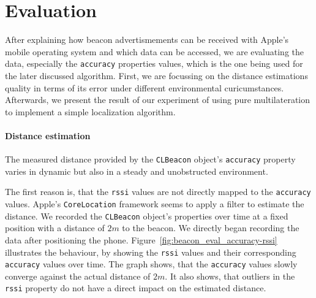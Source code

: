 
\section{Evaluation}
After explaining how beacon advertismements can be received with Apple's mobile operating system and which data can be accessed, we are evaluating the data, especially the \texttt{accuracy} properties values, which is the one being used for the later discussed algorithm.
First, we are focussing on the distance estimations quality in terms of its error under different environmental curicumstances.
Afterwards, we present the result of our experiment of using pure multilateration to implement a simple localization algorithm.

\paragraph{Distance estimation}

The measured distance provided by the \texttt{CLBeacon} object's \texttt{accuracy} property varies in dynamic but also in a steady and unobstructed environment.

The first reason is, that the \texttt{rssi} values are not directly mapped to the \texttt{accuracy} values.
Apple's \texttt{CoreLocation} framework seems to apply a filter to estimate the distance.
We recorded the \texttt{CLBeacon} object's properties over time at a fixed position with a distance of $2m$ to the beacon.
We directly began recording the data after positioning the phone.
Figure~\ref{fig:beacon_eval_accuracy-rssi} illustrates the behaviour, by showing the \texttt{rssi} values and their corresponding \texttt{accuracy} values over time.
The graph shows, that the \texttt{accuracy} values slowly converge against the actual distance of $2m$. It also shows, that outliers in the \texttt{rssi} property do not have a direct impact on the estimated distance.\newline


